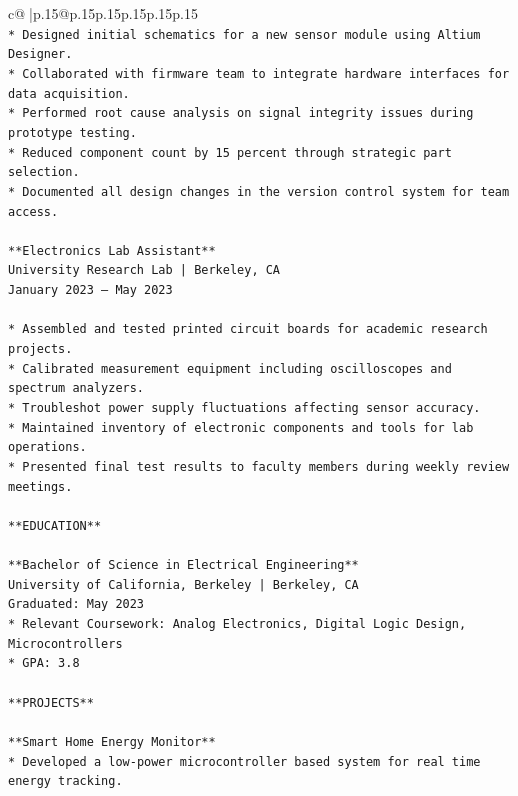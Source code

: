 \documentclass{article}
\begin{document}
{\begin{supertabular}{c@{$\;$}|p{.15\linewidth}@{}p{.15\linewidth}p{.15\linewidth}p{.15\linewidth}p{.15\linewidth}p{.15\linewidth}}
{{{\\ 
\texttt{*   Designed initial schematics for a new sensor module using Altium Designer.} \\
\texttt{*   Collaborated with firmware team to integrate hardware interfaces for data acquisition.} \\
\texttt{*   Performed root cause analysis on signal integrity issues during prototype testing.} \\
\texttt{*   Reduced component count by 15 percent through strategic part selection.} \\
\texttt{*   Documented all design changes in the version control system for team access.} \\
\\ 
\texttt{**Electronics Lab Assistant**} \\
\texttt{University Research Lab | Berkeley, CA} \\
\texttt{January 2023 – May 2023} \\
\\ 
\texttt{*   Assembled and tested printed circuit boards for academic research projects.} \\
\texttt{*   Calibrated measurement equipment including oscilloscopes and spectrum analyzers.} \\
\texttt{*   Troubleshot power supply fluctuations affecting sensor accuracy.} \\
\texttt{*   Maintained inventory of electronic components and tools for lab operations.} \\
\texttt{*   Presented final test results to faculty members during weekly review meetings.} \\
\\ 
\texttt{**EDUCATION**} \\
\\ 
\texttt{**Bachelor of Science in Electrical Engineering**} \\
\texttt{University of California, Berkeley | Berkeley, CA} \\
\texttt{Graduated: May 2023} \\
\texttt{*   Relevant Coursework: Analog Electronics, Digital Logic Design, Microcontrollers} \\
\texttt{*   GPA: 3.8} \\
\\ 
\texttt{**PROJECTS**} \\
\\ 
\texttt{**Smart Home Energy Monitor**} \\
\texttt{*   Developed a low{-}power microcontroller based system for real time energy tracking.} \\
}}}
\end{supertabular}}
\end{document}

